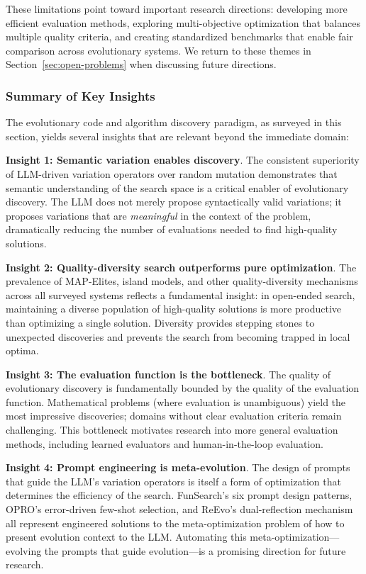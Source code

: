 These limitations point toward important research directions: developing more efficient evaluation methods, exploring multi-objective optimization that balances multiple quality criteria, and creating standardized benchmarks that enable fair comparison across evolutionary systems. We return to these themes in Section~\ref{sec:open-problems} when discussing future directions.

\subsubsection{Summary of Key Insights}

The evolutionary code and algorithm discovery paradigm, as surveyed in this section, yields several insights that are relevant beyond the immediate domain:

\textbf{Insight 1: Semantic variation enables discovery}. The consistent superiority of LLM-driven variation operators over random mutation demonstrates that semantic understanding of the search space is a critical enabler of evolutionary discovery. The LLM does not merely propose syntactically valid variations; it proposes variations that are \emph{meaningful} in the context of the problem, dramatically reducing the number of evaluations needed to find high-quality solutions.

\textbf{Insight 2: Quality-diversity search outperforms pure optimization}. The prevalence of MAP-Elites, island models, and other quality-diversity mechanisms across all surveyed systems reflects a fundamental insight: in open-ended search, maintaining a diverse population of high-quality solutions is more productive than optimizing a single solution. Diversity provides stepping stones to unexpected discoveries and prevents the search from becoming trapped in local optima.

\textbf{Insight 3: The evaluation function is the bottleneck}. The quality of evolutionary discovery is fundamentally bounded by the quality of the evaluation function. Mathematical problems (where evaluation is unambiguous) yield the most impressive discoveries; domains without clear evaluation criteria remain challenging. This bottleneck motivates research into more general evaluation methods, including learned evaluators and human-in-the-loop evaluation.

\textbf{Insight 4: Prompt engineering is meta-evolution}. The design of prompts that guide the LLM's variation operators is itself a form of optimization that determines the efficiency of the search. FunSearch's six prompt design patterns, OPRO's error-driven few-shot selection, and ReEvo's dual-reflection mechanism all represent engineered solutions to the meta-optimization problem of how to present evolution context to the LLM. Automating this meta-optimization---evolving the prompts that guide evolution---is a promising direction for future research.

